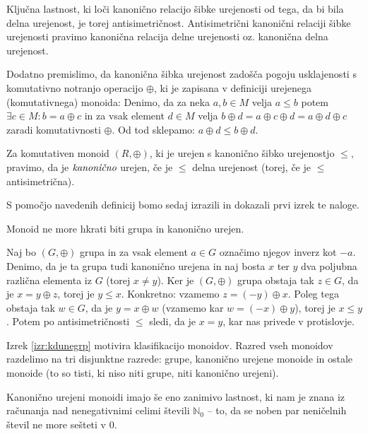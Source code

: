 \documentclass[mat1]{fmfdelo}
\newcommand{\N}{\mathbb{N}}
\newcommand{\No}{\N_0}
\newcommand{\pojem}[1]{\ensuremath{\emph{#1}}}
\begin{document}
Ključna lastnost, ki loči kanonično relacijo šibke urejenosti od tega, da bi bila delna urejenost, je torej antisimetričnost. Antisimetrični kanonični relaciji šibke urejenosti pravimo kanonična relacija delne urejenosti oz. kanonična delna urejenost.

Dodatno premislimo, da kanonična šibka urejenost zadošča pogoju usklajenosti s komutativno notranjo operacijo $\oplus$, ki je zapisana v definiciji urejenega (komutativnega) monoida: Denimo, da za neka $a, b\in M$ velja $a \leq b$ potem $\exists c\in M: b = a \oplus c$ in za vsak element $d\in M$ velja $b \oplus d = a \oplus c \oplus d = a \oplus d \oplus c$ zaradi komutativnosti $\oplus$. Od tod sklepamo: $a \oplus d \leq b \oplus d$.
	
\begin{definicija}
		Za komutativen monoid $(R, \oplus)$, ki je urejen s kanonično šibko urejenostjo $\leq$, pravimo, da je \pojem{kanonično} urejen, če je $\leq$ delna urejenost (torej, če je $\leq$ antisimetrična).
\end{definicija}
S pomočjo navedenih definicij bomo sedaj izrazili in dokazali prvi izrek te naloge.

\begin{izrek}
	\label{izr:kdunegrp}
	Monoid ne more hkrati biti grupa in kanonično urejen.
\end{izrek}
\begin{dokaz}
	Naj bo $(G, \oplus)$ grupa in za vsak element $a\in G$ označimo njegov inverz kot $-a$. Denimo, da je ta grupa tudi kanonično urejena in naj bosta $x$ ter $y$ dva poljubna različna elementa iz $G$ (torej $x\neq y$).
	Ker je $(G, \oplus)$ grupa obstaja tak $z\in G$, da je $x = y \oplus z$, torej je $y \leq x$. Konkretno: vzamemo $z = (-y)\oplus x$. Poleg tega obstaja tak $w\in G$, da je $y = x \oplus w$ (vzamemo kar $w = (-x)\oplus y$), torej je $x \leq y$. Potem po antisimetričnosti $\leq$ sledi, da je $x = y$, kar nas privede v protislovje.
\end{dokaz}

\begin{opomba}
	Izrek \ref{izr:kdunegrp} motivira klasifikacijo monoidov. Razred vseh monoidov razdelimo na tri disjunktne razrede: grupe, kanonično urejene monoide in ostale monoide (to so tisti, ki niso niti grupe, niti kanonično urejeni).
\end{opomba}

Kanonično urejeni monoidi imajo še eno zanimivo lastnost, ki nam je znana iz računanja nad nenegativnimi celimi števili $\No$ -- to, da se noben par neničelnih števil ne more sešteti v $0$.
\end{document}
